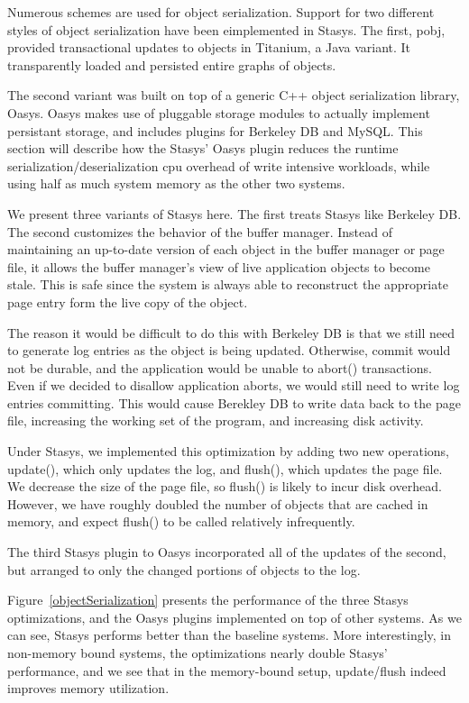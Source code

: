 \documentclass[letterpaper,twocolumn,10pt]{article}
\newcommand{\yad}{Stasys\xspace}
\newcommand{\yads}{Stasys'\xspace}
\newcommand{\oasys}{Oasys\xspace}
\begin{document}
Numerous schemes are used for object serialization.  Support for two
different styles of object serialization have been eimplemented in
\yad.  The first, pobj, provided transactional updates to objects in
Titanium, a Java variant.  It transparently loaded and persisted
entire graphs of objects.

The second variant was built on top of a generic C++ object
serialization library, \oasys.  \oasys makes use of pluggable storage
modules to actually implement persistant storage, and includes plugins
for Berkeley DB and MySQL.  This section will describe how the \yads
\oasys plugin reduces the runtime serialization/deserialization cpu
overhead of write intensive workloads, while using half as much system
memory as the other two systems.

We present three variants of \yad here.  The first treats \yad like
Berkeley DB.  The second customizes the behavior of the buffer
manager.  Instead of maintaining an up-to-date version of each object
in the buffer manager or page file, it allows the buffer manager's
view of live application objects to become stale.  This is safe since
the system is always able to reconstruct the appropriate page entry
form the live copy of the object.

The reason it would be difficult to do this with Berkeley DB is that
we still need to generate log entries as the object is being updated.
Otherwise, commit would not be durable, and the application would be
unable to abort() transactions.  Even if we decided to disallow
application aborts, we would still need to write log entries
committing.  This would cause Berekley DB to write data back to the
page file, increasing the working set of the program, and increasing
disk activity.

Under \yad, we implemented this optimization by adding two new
operations, update(), which only updates the log, and flush(), which
updates the page file.  We decrease the size of the page file, so
flush() is likely to incur disk overhead.  However, we have roughly
doubled the number of objects that are cached in memory, and expect
flush() to be called relatively infrequently.

The third \yad plugin to \oasys incorporated all of the updates of the
second, but arranged to only the changed portions of objects to the
log.

Figure~\ref{objectSerialization} presents the performance of the three
\yad optimizations, and the \oasys plugins implemented on top of other
systems.  As we can see, \yad performs better than the baseline
systems.  More interestingly, in non-memory bound systems, the
optimizations nearly double \yads performance, and we see that in the
memory-bound setup, update/flush indeed improves memory utilization.
\end{document}
